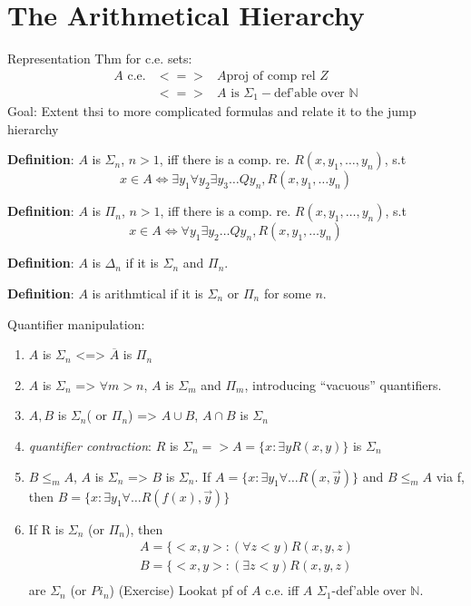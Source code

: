 \documentclass[12pt]{article}
\newcommand{\Nat}{\ensuremath{\mathbb{N}}}
\newcommand{\Conj}[1]{\ensuremath{\overline{#1}}}
\newcommand{\defn}{\textbf{Definition}: }
\begin{document}
\section*{The Arithmetical Hierarchy}

Representation Thm for c.e. sets:
\begin{align*}
 A \text{ c.e.} &<=>& A \text{proj of comp rel } Z \\
&<=>& A \text{ is  } \Sigma_1-\text{def'able over } \Nat
\end{align*}
Goal: Extent thsi to more complicated formulas and relate it to the jump hierarchy

\defn $A$ is $\Sigma_n$, $n > 1$, iff there is
	a comp. re. $R(x, y_1, \ldots, y_n)$, s.t
\[
 x \in A \Leftrightarrow \exists y_1 \forall y_2 \exists y_3 \ldots Q y_n, R(x, y_1, \ldots y_n)
\]

\defn $A$ is $\Pi_n$, $n > 1$, iff there is
	a comp. re. $R(x, y_1, \ldots, y_n)$, s.t
\[
 x \in A \Leftrightarrow \forall y_1 \exists y_2 \ldots Q y_n, R(x, y_1, \ldots y_n)
\]

\defn $A$ is $\Delta_n$ if it is $\Sigma_n$ and $\Pi_n$.

\defn $A$ is arithmtical if it is $\Sigma_n$ or $\Pi_n$ for some $n$.

Quantifier manipulation:
\begin{enumerate}[(1)]
 \item $A$ is $\Sigma_n$ <=> $\Conj{A}$ is $\Pi_n$
 \item $A$ is $\Sigma_n$ => $\forall m > n$, $A$ is $\Sigma_m$ and $\Pi_m$, 
	introducing ``vacuous'' quantifiers.
 \item $A,B$ is $\Sigma_n$( or $\Pi_n$)	=> $A \cup B$, $A \cap B$ is $\Sigma_n$
 \item \emph{quantifier contraction}:
	$R$ is $\Sigma_n	=> A = \{x : \exists y R(x,y) \}$ is $\Sigma_n$
 \item $B \le_m A$, $A$ is $\Sigma_n$ => $B$ is $\Sigma_n$.
	\proof  If $A = \{ x : \exists y_1 \forall \ldots R(x, \vec{y}) \}$
	and $B \le_m A$ via f,
	then $B = \{ x : \exists y_1 \forall \ldots R(f(x), \vec{y}) \}$
 \item If R is $\Sigma_n$ (or $\Pi_n$), then
	\begin{align*}
	 A = \{ <x, y> : (\forall z < y) R(x,y,z) \\
	 B = \{ <x, y> : (\exists z < y) R(x,y,z) \\
	\end{align*}
	are $\Sigma_n$ (or $Pi_n$)
		\proof (Exercise) Lookat pf of $A$ c.e. iff $A$ $\Sigma_1$-def'able over $\Nat$.

\end{enumerate}
\end{document}
